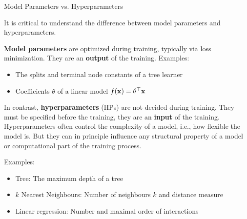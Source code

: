 
\begin{frame}{Model Parameters vs. Hyperparameters}

It is critical to understand the difference between model parameters and hyperparameters.

\vspace{0.5cm}

\textbf{Model parameters} are optimized during training, typically via loss minimization. They are an \textbf{output} of the training. Examples:
\begin{itemize}
\item The splits and terminal node constants of a tree learner
\item Coefficients $\theta$ of a linear model $f(\mathbf{x}) = \theta^\top\mathbf{x}$
\end{itemize}

\framebreak

In contrast, \textbf{hyperparameters} (HPs) are not decided during training. They must be specified before the training, they are an \textbf{input} of the training.
Hyperparameters often control the complexity of a model, i.e., how flexible the model is.
But they can in principle influence any structural property of a model or computational part of the training process.

\vspace{0.5cm}

Examples:

\begin{itemize}
\item Tree: The maximum depth of a tree
\item $k$ Nearest Neighbours: Number of neighbours $k$ and distance measure
\item Linear regression: Number and maximal order of interactions
\end{itemize}

\end{frame}


